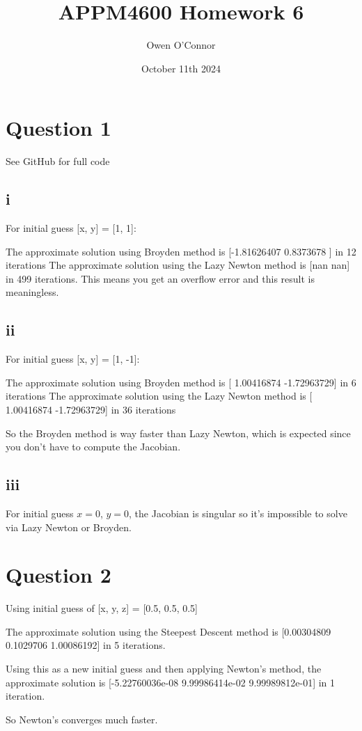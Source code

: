 \documentclass{article}
\title{APPM4600 Homework 6}
\author{Owen O'Connor}
\date{October 11th 2024}
\begin{document}
\maketitle

\section{Question 1}
See GitHub for full code
\subsection{i}
For initial guess [x, y] = [1, 1]:

The approximate solution using Broyden method is [-1.81626407  0.8373678 ] in 12 iterations
The approximate solution using the Lazy Newton method is [nan nan] in 499 iterations. This means you get an overflow error and this result is meaningless.

\subsection{ii}
For initial guess [x, y] = [1, -1]:

The approximate solution using Broyden method is [ 1.00416874 -1.72963729] in 6 iterations
The approximate solution using the Lazy Newton method is [ 1.00416874 -1.72963729] in 36 iterations

So the Broyden method is way faster than Lazy Newton, which is expected since you don't have to compute the Jacobian.
\subsection{iii}
For initial guess $x = 0$, $y = 0$, the Jacobian is singular so it's impossible to solve via Lazy Newton or Broyden.

\section{Question 2}
Using initial guess of [x, y, z] = [0.5, 0.5, 0.5] 

The approximate solution using the Steepest Descent method is [0.00304809 0.1029706  1.00086192] in 5 iterations.

Using this as a new initial guess and then applying Newton's method, the approximate solution is [-5.22760036e-08  9.99986414e-02  9.99989812e-01] in 1 iteration.

So Newton's converges much faster.
\end{document}
